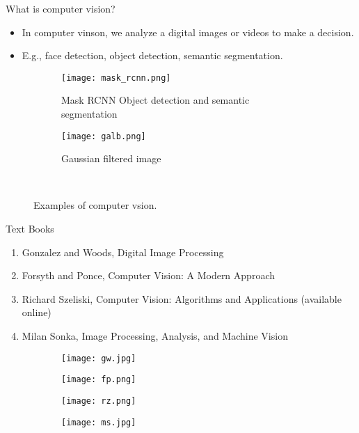 \begin{frame}{What is computer vision?}
    \begin{itemize}%
        \item In computer vinson, we analyze a digital images or videos  to  make a decision.
        \item E.g., face detection, object detection, semantic segmentation.
    \end{itemize}
    \begin{figure}[ht]
      \centering
      \begin{subfigure}[b]{0.5\linewidth}
        \centering\texttt{[image: mask\_rcnn.png]}
        \caption{Mask RCNN Object detection and semantic segmentation}\label{sf:mask_rc}
      \end{subfigure}%
      \begin{subfigure}[b]{0.5\linewidth}
        \centering\texttt{[image: galb.png]}
        \caption{Gaussian filtered image}\label{sf:galb}
      \end{subfigure}\\
      \caption{Examples of computer vsion.}
    \end{figure}
\end{frame}

\begin{frame}{Text Books}
    \begin{enumerate}
        \item Gonzalez and Woods, Digital Image Processing
        \item Forsyth and Ponce, Computer Vision: A Modern Approach
        \item Richard Szeliski, Computer Vision: Algorithms and Applications (available online)
        \item Milan Sonka, Image Processing, Analysis, and Machine Vision
    \end{enumerate}
    \begin{figure}[ht]
      \centering
      \begin{subfigure}[b]{0.22\linewidth}
        \centering\texttt{[image: gw.jpg]}
        \caption{}\label{sf:gw}
      \end{subfigure}%
      \begin{subfigure}[b]{0.22\linewidth}
        \centering\texttt{[image: fp.png]}
        \caption{}\label{sf:fp}
      \end{subfigure}
      \begin{subfigure}[b]{0.22\linewidth}
        \centering\texttt{[image: rz.png]}
        \caption{}\label{sf:rz}
      \end{subfigure}
      \begin{subfigure}[b]{0.22\linewidth}
        \centering\texttt{[image: ms.jpg]}
        \caption{}\label{sf:ms}
      \end{subfigure}
      \caption{}
    \end{figure}

\end{frame}

